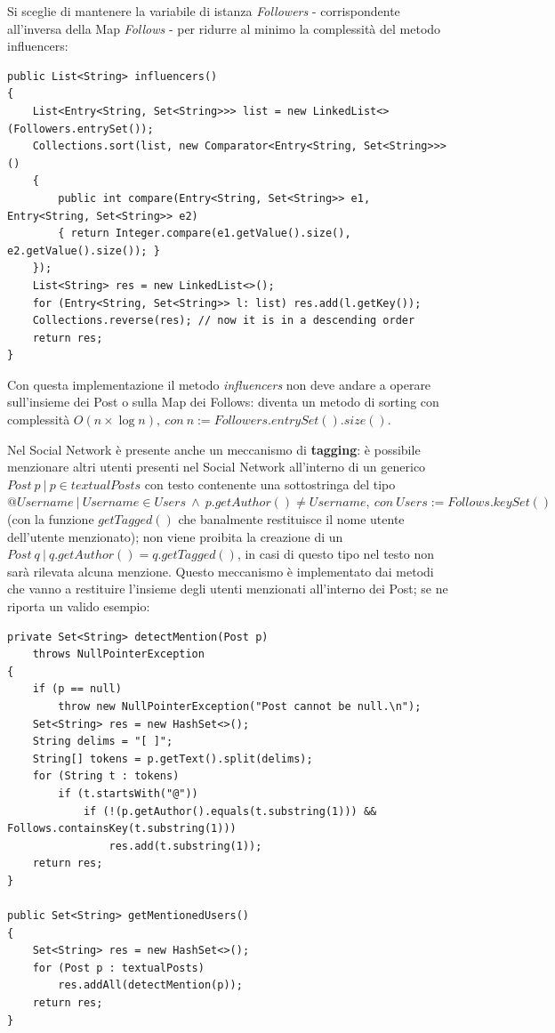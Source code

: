 \documentclass[10pt, italian, openany]{book}
\begin{document}
Si sceglie di mantenere la variabile di istanza \textit{Followers} - corrispondente all'inversa della Map \textit{Follows} - per ridurre al minimo la complessit\`a del metodo influencers:
\begin{lstlisting}[style=codeStyle]
public List<String> influencers()
{
    List<Entry<String, Set<String>>> list = new LinkedList<>(Followers.entrySet());
    Collections.sort(list, new Comparator<Entry<String, Set<String>>>()
    {
        public int compare(Entry<String, Set<String>> e1, Entry<String, Set<String>> e2)
        { return Integer.compare(e1.getValue().size(), e2.getValue().size()); }
    });
    List<String> res = new LinkedList<>();
    for (Entry<String, Set<String>> l: list) res.add(l.getKey());
    Collections.reverse(res); // now it is in a descending order
    return res;
}
\end{lstlisting}
Con questa implementazione il metodo \textit{influencers} non deve andare a operare sull'insieme dei Post o sulla Map dei Follows: diventa un metodo di sorting con complessit\`a \(O(n \times \log n), \ con \ n := Followers.entrySet().size()\).

Nel Social Network \`e presente anche un meccanismo di \textbf{tagging}: \`e possibile menzionare altri utenti presenti nel Social Network all'interno di un generico \(Post \ p \ | \ p \in textualPosts\) con testo contenente una sottostringa del tipo \(@Username \ | \ Username \in Users \ \wedge \ p.getAuthor() \neq Username, \ con \ Users := Follows.keySet()\) (con la funzione \(getTagged()\) che banalmente restituisce il nome utente dell'utente menzionato); non viene proibita la creazione di un \(Post \ q \ | \ q.getAuthor() = q.getTagged()\), in casi di questo tipo nel testo non sar\`a rilevata alcuna menzione. 
Questo meccanismo \`e implementato dai metodi che vanno a restituire l'insieme degli utenti menzionati all'interno dei Post; se ne riporta un valido esempio:
\begin{lstlisting}[style=codeStyle]
private Set<String> detectMention(Post p)
    throws NullPointerException
{
    if (p == null)
        throw new NullPointerException("Post cannot be null.\n");
    Set<String> res = new HashSet<>();
    String delims = "[ ]";
    String[] tokens = p.getText().split(delims);
    for (String t : tokens)
        if (t.startsWith("@")) 
            if (!(p.getAuthor().equals(t.substring(1))) && Follows.containsKey(t.substring(1)))
                res.add(t.substring(1));
    return res;
}

public Set<String> getMentionedUsers()
{
    Set<String> res = new HashSet<>();
    for (Post p : textualPosts)
        res.addAll(detectMention(p));
    return res;
}
\end{lstlisting}
\end{document}
